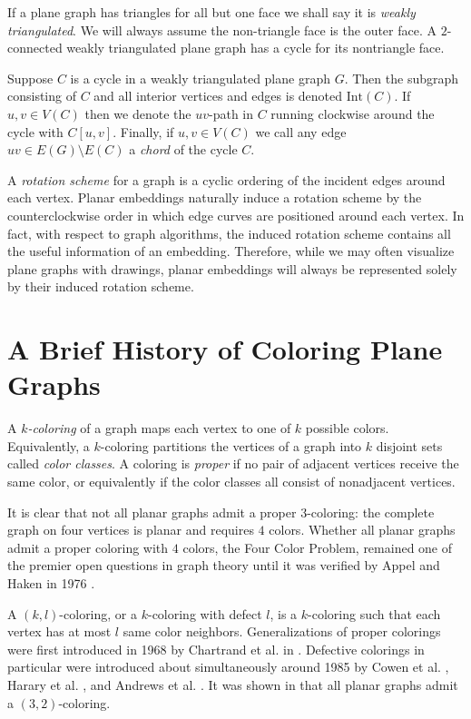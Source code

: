 \documentclass[letterpaper, 12pt]{article}
\theoremstyle{definition}
\theoremstyle{definition}
\theoremstyle{thm}
\theoremstyle{definition}
\begin{document}
If a plane graph has triangles for all but one face we shall say it is
\textit{weakly triangulated}. We will always assume the non-triangle face is the
outer face. A $2$-connected weakly triangulated plane graph has a cycle for its
nontriangle face.

Suppose $C$ is a cycle in a weakly
triangulated plane graph $G$. Then the subgraph consisting of $C$ and all interior
vertices and edges is denoted $\text{Int}(C)$. If $u,v \in V(C)$ then we denote
the $uv$-path in $C$ running clockwise around the cycle with $C[u,v]$. Finally,
if $u,v\in V(C)$ we call any edge $uv \in E(G)\setminus E(C)$ a \textit{chord} of
the cycle $C$.

A \textit{rotation scheme} for a graph is a cyclic ordering of the incident
edges around each vertex. Planar embeddings naturally induce a rotation
scheme by the counterclockwise order in which edge curves are positioned around
each vertex. In fact, with respect to graph algorithms, the induced rotation
scheme contains all the useful information of an embedding. Therefore, while we
may often visualize plane graphs with drawings, planar embeddings will always be
represented solely by their induced rotation scheme.

\section{A Brief History of Coloring Plane Graphs}

A $k$\textit{-coloring} of a graph maps each vertex to one of $k$ possible
colors. Equivalently, a $k$-coloring partitions the vertices of a graph into $k$
disjoint sets called \textit{color classes}. 
A coloring is \textit{proper} if no pair of adjacent vertices receive the same
color, or equivalently if the color classes all consist of nonadjacent vertices.

It is clear that not all planar graphs admit a proper $3$-coloring: the
complete graph on four vertices is planar and requires $4$ colors. Whether all
planar graphs admit a proper coloring with $4$ colors, the Four Color Problem,
remained one of the premier open questions in graph theory until it was verified
by Appel and Haken in 1976 \cite{appel1, appel2}.

A $(k,l)$-coloring, or a $k$-coloring with defect $l$, is a
$k$-coloring such that each vertex has at most $l$ same color neighbors.
Generalizations of proper colorings were first introduced in 1968 by Chartrand et al. in
\cite{chartrand}. Defective colorings in particular were introduced about
simultaneously around 1985 by Cowen et al. \cite{cowen}, Harary et al. \cite{jones}, and
Andrews et al. \cite{jacobson}. It was shown in \cite{cowen} that all
planar graphs admit a $(3,2)$-coloring.
\end{document}
